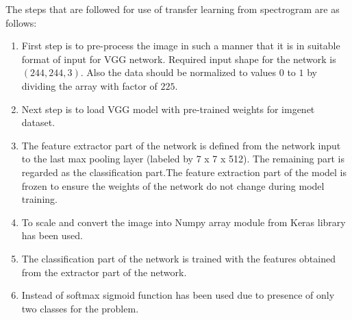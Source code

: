   The steps that are followed for use of transfer learning from spectrogram are as follows:
  \begin{enumerate}
  	\item First step is to pre-process the image in such a manner that it is in suitable format of input for VGG network. Required input shape for the network is $(244,244,3)$. Also the data should be normalized to values $0$ to $1$ by dividing the array with factor of $225$.

  	\item Next step is to load VGG model with pre-trained weights for imgenet dataset.  
  	
  	\item  The feature extractor part of the network is defined from the network input to the last max pooling layer (labeled by 7 x 7 x 512). The remaining part is regarded as the classification part.The feature extraction part of the model is frozen to ensure the weights of the network do not change during model training.
  	
  	\item To scale and convert the image into Numpy array module from Keras \cite{ketkar2017introduction} library has been used.
  	
  	\item The classification part of the network is trained with the features obtained from the extractor part of the network.
  	
    \item Instead of softmax sigmoid function has been used due to presence of only two classes for the problem.
  \end{enumerate}
  
  

